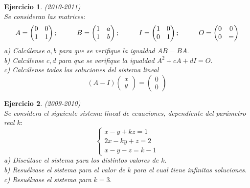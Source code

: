\documentclass[12pt, a4paper]{amsart}
\newtheorem{ejer}{Ejercicio}
\begin{document}
\begin{ejer}\em (2010-2011)\\
Se consideran las matrices:
\[A=\begin{pmatrix}
0 & 0 \\
1 & 1
\end{pmatrix};\hspace*{1cm} B=\begin{pmatrix}
1 & a\\
1 & b
\end{pmatrix};\hspace*{1cm}  I=\begin{pmatrix}
1 & 0\\
0 & 1
\end{pmatrix};\hspace*{1cm} O=\begin{pmatrix}
0 & 0\\
0 & =
\end{pmatrix}\]
a) Calcúlense $a,b$ para que se verifique la igualdad $AB=BA.$\\
b) Calcúlense $c,d$ para que se verifique la igualdad $A^2+cA+dI=O.$\\
c) Calcúlense todas las soluciones del sistema lineal
\[(A-I)\begin{pmatrix}
x\\y
\end{pmatrix}=\begin{pmatrix}
0\\0
\end{pmatrix}\]
\end{ejer}

\begin{ejer}\em (2009-2010)\\
Se considera el siguiente sistema lineal de ecuaciones, dependiente del parámetro real $k:$
\begin{equation*}
\left \{ \begin{matrix} x-y+kz=1
\\ 2x-ky+z=2
\\ x-y-z=k-1 \end{matrix}\right. 
\end{equation*}
a) Discútase el sistema para los distintos valores de $k.$\\
b) Resuélvase el sistema para el valor de $k$ para el cual tiene infinitas soluciones.\\
c) Resuélvase el sistema para $k=3.$
\end{ejer}
\end{document}
